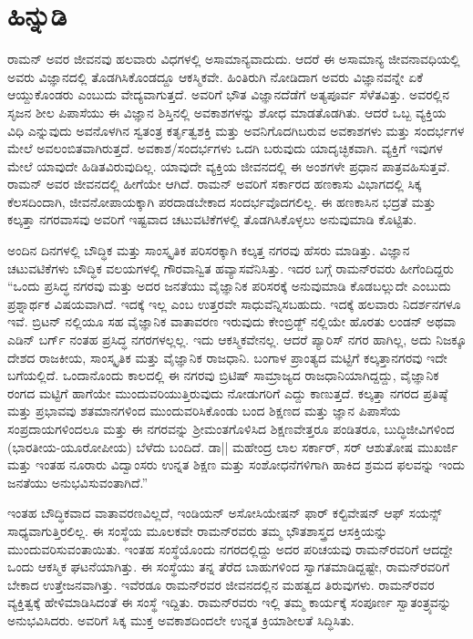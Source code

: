 
\chapter*{ಹಿನ್ನುಡಿ}

ರಾಮನ್ ಅವರ ಜೀವನವು ಹಲವಾರು ವಿಧಗಳಲ್ಲಿ ಅಸಾಮಾನ್ಯವಾದುದು. ಆದರೆ ಈ ಅಸಾಮಾನ್ಯ ಜೀವನಾವಧಿಯಲ್ಲಿ ಅವರು ವಿಜ್ಞಾನದಲ್ಲಿ ತೊಡಗಿಸಿಕೊಂಡದ್ದೂ ಆಕಸ್ಮಿಕವೇ. ಹಿಂತಿರುಗಿ ನೋಡಿದಾಗ ಅವರು ವಿಜ್ಞಾನವನ್ನೇ ಏಕೆ ಆಯ್ದುಕೊಂಡರು ಎಂಬುದು ವೇದ್ಯವಾಗುತ್ತದೆ. ಅವರಿಗೆ ಭೌತ ವಿಜ್ಞಾನದೆಡೆಗೆ ಅತ್ಯಪೂರ್ವ ಸೆಳೆತವಿತ್ತು. ಅವರಲ್ಲಿನ ಸೃಜನ ಶೀಲ ಪಿಪಾಸೆಯು ಈ ವಿಜ್ಞಾನ ಶಿಸ್ತಿನಲ್ಲಿ ಅವಕಾಶಗಳನ್ನು ಶೋಧ ಮಾಡತೊಡಗಿತು. ಆದರೆ ಒಬ್ಬ ವ್ಯಕ್ತಿಯ ವಿಧಿ ಎನ್ನುವುದು ಅವನೊಳಗಿನ ಸ್ವತಂತ್ರ ಕರ್ತೃತ್ವಶಕ್ತಿ ಮತ್ತು ಅವನಿಗೊದಗಿಬರುವ ಅವಕಾಶಗಳು ಮತ್ತು ಸಂದರ್ಭಗಳ ಮೇಲೆ ಅವಲಂಬಿತವಾಗಿರುತ್ತದೆ. ಅವಕಾಶ/ಸಂದರ್ಭಗಳು ಒದಗಿ ಬರುವುದು ಯಾದೃಚ್ಛಿಕವಾಗಿ. ವ್ಯಕ್ತಿಗೆ ಇವುಗಳ ಮೇಲೆ ಯಾವುದೇ ಹಿಡಿತವಿರುವುದಿಲ್ಲ. ಯಾವುದೇ ವ್ಯಕ್ತಿಯ ಜೀವನದಲ್ಲಿ ಈ ಅಂಶಗಳೇ ಪ್ರಧಾನ ಪಾತ್ರವಹಿಸುತ್ತವೆ. ರಾಮನ್ ಅವರ ಜೀವನದಲ್ಲಿ ಹೀಗೆಯೇ ಆಗಿದೆ. ರಾಮನ್ ಅವರಿಗೆ ಸರ್ಕಾರದ ಹಣಕಾಸು ವಿಭಾಗದಲ್ಲಿ ಸಿಕ್ಕ ಕೆಲಸದಿಂದಾಗಿ, ಜೀವನೋಪಾಯಕ್ಕಾಗಿ ಪರದಾಡಬೇಕಾದ ಸಂದರ್ಭವೊದಗಲಿಲ್ಲ. ಈ ಹಣಕಾಸಿನ ಭದ್ರತೆ ಮತ್ತು ಕಲ್ಕತ್ತಾ ನಗರವಾಸವು ಅವರಿಗೆ ಇಷ್ಟವಾದ ಚಟುವಟಿಕೆಗಳಲ್ಲಿ ತೊಡಗಿಸಿಕೊಳ್ಳಲು ಅನುವುಮಾಡಿ ಕೊಟ್ಟಿತು.

ಅಂದಿನ ದಿನಗಳಲ್ಲಿ ಬೌದ್ಧಿಕ ಮತ್ತು ಸಾಂಸ್ಕೃತಿಕ ಪರಿಸರಕ್ಕಾಗಿ ಕಲ್ಕತ್ತ ನಗರವು ಹೆಸರು ಮಾಡಿತ್ತು. ವಿಜ್ಞಾನ ಚಟುವಟಿಕೆಗಳು ಬೌದ್ಧಿಕ ವಲಯಗಳಲ್ಲಿ ಗೌರವಾನ್ವಿತ ಹವ್ಯಾಸವೆನಿಸಿತ್ತು. ಇದರ ಬಗ್ಗೆ ರಾಮನ್‍ರವರು ಹೀಗೆಂದಿದ್ದರು “ಒಂದು ಪ್ರಸಿದ್ಧ ನಗರವು ಮತ್ತು ಅದರ ಜನತೆಯು ವೈಜ್ಞಾನಿಕ ಪರಿಸರಕ್ಕೆ ಅನುವುಮಾಡಿ ಕೊಡಬಲ್ಲುದೇ ಎಂಬುದು ಪ್ರಶ್ನಾರ್ಥಕ ವಿಷಯವಾಗಿದೆ. ಇದಕ್ಕೆ ಇಲ್ಲ ಎಂಬ ಉತ್ತರವೇ ಸಾಧುವೆನ್ನಿಸಬಹುದು. ಇದಕ್ಕೆ ಹಲವಾರು ನಿದರ್ಶನಗಳೂ ಇವೆ. ಬ್ರಿಟನ್ ನಲ್ಲಿಯೂ ಸಹ ವೈಜ್ಞಾನಿಕ ವಾತಾವರಣ ಇರುವುದು ಕೇಂಬ್ರಿಡ್ಜ್ ನಲ್ಲಿಯೇ ಹೊರತು ಲಂಡನ್ ಅಥವಾ ಎಡಿನ್ ಬರ್ಗ್ ನಂತಹ ಪ್ರಸಿದ್ಧ ನಗರಗಳಲ್ಲಲ್ಲ. ಇದು ಆಕಸ್ಮಿಕವೇನಲ್ಲ. ಆದರೆ ಪ್ಯಾರಿಸ್ ನಗರ ಹಾಗಿಲ್ಲ, ಅದು ನಿಜಕ್ಕೂ ದೇಶದ ರಾಜಕೀಯ, ಸಾಂಸ್ಕೃತಿಕ ಮತ್ತು ವೈಜ್ಞಾನಿಕ ರಾಜಧಾನಿ. ಬಂಗಾಳ ಪ್ರಾಂತ್ಯದ ಮಟ್ಟಿಗೆ ಕಲ್ಕತ್ತಾನಗರವು ಇದೇ ಬಗೆಯಲ್ಲಿದೆ. ಒಂದಾನೊಂದು ಕಾಲದಲ್ಲಿ ಈ ನಗರವು ಬ್ರಿಟಿಷ್ ಸಾಮ್ರಾಜ್ಯದ ರಾಜಧಾನಿಯಾಗಿದ್ದದ್ದು, ವೈಜ್ಞಾನಿಕ ರಂಗದ ಮಟ್ಟಿಗೆ ಹಾಗೆಯೇ ಮುಂದುವರಿಯುತ್ತಿರುವುದು ನೋಡುಗರಿಗೆ ಎದ್ದು ಕಾಣುತ್ತದೆ. ಕಲ್ಕತ್ತಾ ನಗರದ ಪ್ರತಿಷ್ಠೆ ಮತ್ತು ಪ್ರಭಾವವು ಶತಮಾನಗಳಿಂದ ಮುಂದುವರಿಸಿಕೊಂಡು ಬಂದ ಶಿಕ್ಷಣದ ಮತ್ತು ಜ್ಞಾನ ಪಿಪಾಸೆಯ ಸಂಪ್ರದಾಯಗಳಿಂದಲೂ ಮತ್ತು ಈ ನಗರವನ್ನು ಶ‍್ರೀಮಂತಗೊಳಿಸಿದ ಶಿಕ್ಷಣವೇತ್ತರೂ ಪಂಡಿತರೂ, ಬುದ್ಧಿಜೀವಿಗಳಿಂದ (ಭಾರತೀಯ-ಯೂರೋಪೀಯ) ಬೆಳೆದು ಬಂದಿದೆ. ಡಾ|| ಮಹೇಂದ್ರ ಲಾಲ ಸರ್ಕಾರ್, ಸರ್ ಆಶುತೋಷ ಮುಖರ್ಜಿ ಮತ್ತು ಇಂತಹ ನೂರಾರು ವಿದ್ವಾಂಸರು ಉನ್ನತ ಶಿಕ್ಷಣ ಮತ್ತು ಸಂಶೋಧನೆಗಳಿಗಾಗಿ ಹಾಕಿದ ಶ್ರಮದ ಫಲವನ್ನು ಇಂದು ಜನತೆಯು ಅನುಭವಿಸುವಂತಾಗಿದೆ.”

ಇಂತಹ ಬೌದ್ಧಿಕವಾದ ವಾತಾವರಣವಿಲ್ಲದೆ, ಇಂಡಿಯನ್ ಅಸೋಸಿಯೇಷನ್ ಫಾರ್ ಕಲ್ಟಿವೇಷನ್ ಆಫ್ ಸಯನ್ಸ್ ಸಾಧ್ಯವಾಗುತ್ತಿರಲಿಲ್ಲ. ಈ ಸಂಸ್ಥೆಯ ಮೂಲಕವೇ ರಾಮನ್‍ರವರು ತಮ್ಮ ಭೌತಶಾಸ್ತ್ರದ ಆಸಕ್ತಿಯನ್ನು ಮುಂದುವರಿಸುವಂತಾಯಿತು. ಇಂತಹ ಸಂಸ್ಥೆಯೊಂದು ನಗರದಲ್ಲಿದ್ದು ಅದರ ಪರಿಚಯವು ರಾಮನ್‍ರವರಿಗೆ ಆದದ್ದೇ ಒಂದು ಆಕಸ್ಮಿಕ ಘಟನೆಯಾಗಿತ್ತು. ಈ ಸಂಸ್ಥೆಯು ತನ್ನ ತೆರೆದ ಬಾಹುಗಳಿಂದ ಸ್ವಾಗತಮಾಡಿದ್ದಷ್ಟೇ, ರಾಮನ್‍ರವರಿಗೆ ಬೇಕಾದ ಉತ್ತೇಜನವಾಗಿತ್ತು. ಇವೆರಡೂ ರಾಮನ್‍ರವರ ಜೀವನದಲ್ಲಿನ ಮಹತ್ವದ ತಿರುವುಗಳು. ರಾಮನ್‍ರವರ ವ್ಯಕ್ತಿತ್ವಕ್ಕೆ ಹೇಳಿಮಾಡಿಸಿದಂತೆ ಈ ಸಂಸ್ಥೆ ಇದ್ದಿತು. ರಾಮನ್‍ರವರು ಇಲ್ಲಿ ತಮ್ಮ ಕಾರ್ಯಕ್ಕೆ ಸಂಪೂರ್ಣ ಸ್ವಾತಂತ್ರ್ಯವನ್ನು ಅನುಭವಿಸಿದರು. ಅವರಿಗೆ ಸಿಕ್ಕ ಮುಕ್ತ ಅವಕಾಶದಿಂದಲೇ ಉನ್ನತ ಕ್ರಿಯಾಶೀಲತೆ ಸಿದ್ಧಿಸಿತು.

